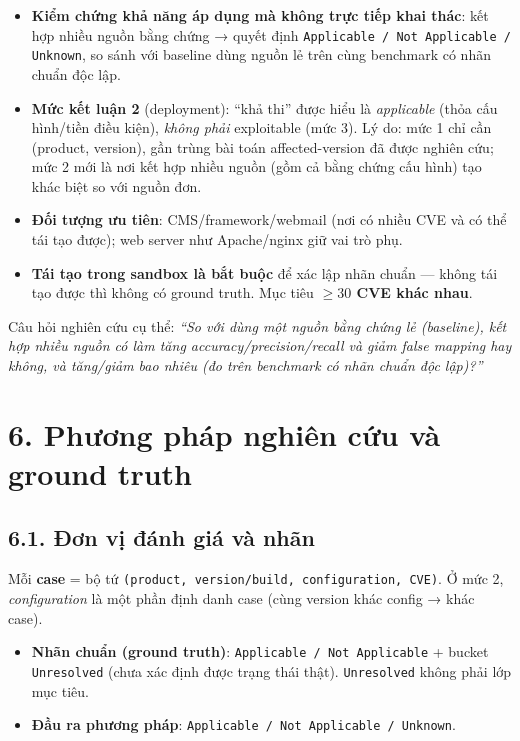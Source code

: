 \documentclass[11pt,a4paper]{article}
\begin{document}
\begin{itemize}
  \item \textbf{Kiểm chứng khả năng áp dụng mà không trực tiếp khai thác}: kết hợp nhiều nguồn bằng chứng → quyết định \texttt{Applicable / Not Applicable / Unknown}, so sánh với baseline dùng nguồn lẻ trên cùng benchmark có nhãn chuẩn độc lập.
  \item \textbf{Mức kết luận 2} (deployment): ``khả thi'' được hiểu là \emph{applicable} (thỏa cấu hình/tiền điều kiện), \emph{không phải} exploitable (mức 3). Lý do: mức 1 chỉ cần (product, version), gần trùng bài toán affected-version đã được nghiên cứu; mức 2 mới là nơi kết hợp nhiều nguồn (gồm cả bằng chứng cấu hình) tạo khác biệt so với nguồn đơn.
  \item \textbf{Đối tượng ưu tiên}: CMS/framework/webmail (nơi có nhiều CVE và có thể tái tạo được); web server như Apache/nginx giữ vai trò phụ.
  \item \textbf{Tái tạo trong sandbox là bắt buộc} để xác lập nhãn chuẩn — không tái tạo được thì không có ground truth. Mục tiêu \textbf{$\ge 30$ CVE khác nhau}.
\end{itemize}

Câu hỏi nghiên cứu cụ thể: \emph{``So với dùng một nguồn bằng chứng lẻ (baseline), kết hợp nhiều nguồn có làm tăng accuracy/precision/recall và giảm false mapping hay không, và tăng/giảm bao nhiêu (đo trên benchmark có nhãn chuẩn độc lập)?''}

\section*{6. Phương pháp nghiên cứu và ground truth}

\subsection*{6.1. Đơn vị đánh giá và nhãn}

Mỗi \textbf{case} = bộ tứ \texttt{(product, version/build, configuration, CVE)}. Ở mức 2, \emph{configuration} là một phần định danh case (cùng version khác config → khác case).

\begin{itemize}
  \item \textbf{Nhãn chuẩn (ground truth)}: \texttt{Applicable / Not Applicable} + bucket \texttt{Unresolved} (chưa xác định được trạng thái thật). \texttt{Unresolved} không phải lớp mục tiêu.
  \item \textbf{Đầu ra phương pháp}: \texttt{Applicable / Not Applicable / Unknown}.
\end{itemize}
\end{document}
